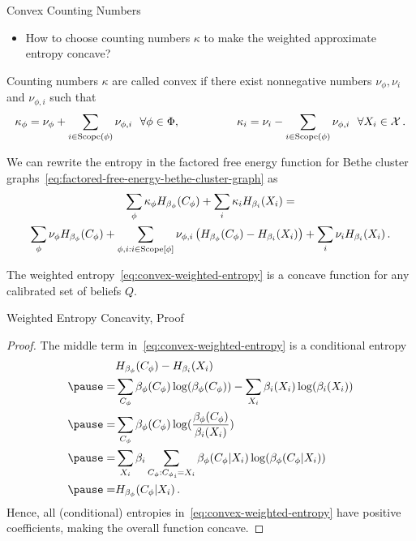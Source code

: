 \begin{frame}{Convex Counting Numbers}
\begin{itemize}
\item How to choose counting numbers $\kappa$ to make the weighted approximate entropy concave?
\end{itemize}
\pause
\begin{definition}
    Counting numbers $\kappa$ are called convex if there exist nonnegative numbers $\nu_{\phi},\nu_i$ and $\nu_{\phi,i}$ such that
    \begin{equation}
        \kappa_{\phi} = \nu_\phi + \sum_{i \in \Scope(\phi)} \nu_{\phi,i} \ \ \forall \phi \in \Phi,
        \quad \quad \quad \quad \quad
        \kappa_{i} = \nu_i - \sum_{i \in \Scope(\phi)} \nu_{\phi,i} \ \  \forall X_i \in \mathcal{X}\,.
    \end{equation}
\end{definition}
\pause
We can rewrite the entropy in the factored free energy function for Bethe cluster graphs~\eqref{eq:factored-free-energy-bethe-cluster-graph} as
\begin{multline}
    \label{eq:convex-weighted-entropy}
   \sum_{\phi} \kappa_{\phi} H_{\beta_{\phi}}(C_\phi) + \sum_{i} \kappa_{i} H_{\beta_{i}}(X_i) 
   = \\
   \sum_{\phi} \nu_{\phi} H_{\beta_{\phi}}(C_\phi) + \sum_{\phi,i : i \in \Scope[\phi]} \nu_{\phi,i} \left( H_{\beta_{\phi}}(C_{\phi}) - H_{\beta_{i}}(X_i) \right) + \sum_i \nu_{i} H_{\beta_{i}}(X_i)\,. 
\end{multline}
\pause
\begin{proposition}
    The weighted entropy~\eqref{eq:convex-weighted-entropy} is a concave function for any calibrated set of beliefs $Q$. 
\end{proposition}
\end{frame}

\begin{frame}{Weighted Entropy Concavity, Proof}
\begin{proof}
   The middle term in~\eqref{eq:convex-weighted-entropy} is a conditional entropy
   \begin{equation}
    \begin{aligned}
    & H_{\beta_{\phi}}(C_{\phi}) - H_{\beta_i}(X_i) \\
    \pause
    = &
    \sum_{C_{\phi}} \beta_{\phi}(C_{\phi}) \log(\beta_{\phi}(C_{\phi})) - \sum_{X_i} \beta_i(X_i) \log(\beta_i(X_i))\\
    \pause
    = &
    \sum_{C_{\phi}} \beta_{\phi}(C_{\phi}) \log(\frac{\beta_{\phi}(C_{\phi})}{\beta_i(X_i)}) \\
    \pause
    = &
    \sum_{X_i} \beta_i \sum_{C_{\phi} : {C_{\phi}}_i = X_i} \beta_{\phi}(C_{\phi} | X_i) \log(\beta_{\phi}(C_{\phi} | X_i)) \\
    \pause
    = &
    H_{\beta_{\phi}}(C_{\phi} | X_i)\,.
    \end{aligned}
   \end{equation}
   \pause
   Hence, all (conditional) entropies in~\eqref{eq:convex-weighted-entropy} have positive coefficients, making the overall function concave.
\end{proof}
\end{frame}

